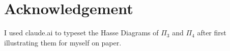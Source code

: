 \documentclass[12pt]{article}
\begin{document}
\newpage{}
\section*{Acknowledgement}
I used claude.ai to typeset the Hasse Diagrams of $\Pi_3$ and $\Pi_4$ after first illustrating them for myself on paper. 
\end{document}

